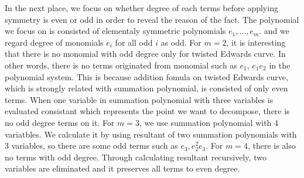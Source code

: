 In the next place, we focus on whether degree of each terms before 
applying symmetry is even or odd in order to reveal the reason of the fact.
%
The polynomial we focus on is consisted of elementaly symmetric polynomials 
$e_1, \dots ,e_m$. and we regard degree of monomials $e_i$ for all odd $i$ as odd.
%
For $m=2$, it is interesting that there is no monomial with odd degree 
only for twisted Edwards curve.
%
In other words, there is no terms originated from monomial
such as $e_1$, $e_1e_2$ in the polynomial system.
%
This is because addition fomula on twisted Edwards curve, 
which is strongly related with summation polynomial, 
is consisted of only even terms.
%
When one variable in summation polynomial with three variables
is evaluated consistant which represents the point we want to decompose, 
there is no odd degree terms on it.
%
For $m=3$, we use summation polynomial with 4 variatbles.
%
We calculate it by using resultant of two summation polynomials 
with 3 variables, so there are some odd terms such as $e_3, e_2^2e_3$.
%
For $m=4$, there is also no terms with odd degree.
%
Through calculating resultant recursively, two variables are eliminated
and it preserves all terms to even degree.

